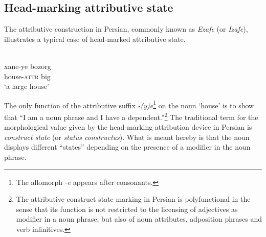 \subsection{Head-marking attributive state} \label{head-marking state}
The attributive construction in Persian, commonly known as \emph{Ezafe} (or \emph{Izafe}), illustrates a typical case of head-marked attributive state.
\begin{exe}
\ex \label{persian constr state}
\\
\gll xane-ye bozorg\\
	house-\textsc{attr} big\\
\glt 	‘a large house’
\end{exe}
The only function of the attributive suffix \textit{-(y)e}\footnote{The allomorph \textit{-e} appears after consonants.} on the noun ‘house’ is to show that “I am a noun phrase and I have a dependent.”\footnote{The attributive construct state marking in Persian is polyfunctional in the sense that its function is not restricted to the licensing of adjectives as modifier in a noun phrase, but also of noun attributes, adposition phrases and verb infinitives.} The traditional term for the morphological value given by the head-marking attribution device in Persian is \emph{construct state} (or \emph{status constructus}). What is meant hereby is that the noun displays different “states” depending on the presence of a modifier in the noun phrase.

